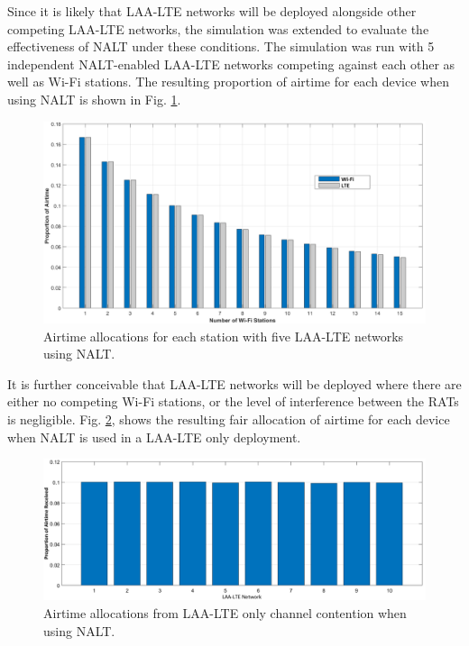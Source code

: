 Since it is likely that \mbox{LAA-LTE} networks will be deployed alongside other competing \mbox{LAA-LTE} networks, the simulation was extended to evaluate the effectiveness of NALT under these conditions.  The simulation was run with 5 independent NALT-enabled \mbox{LAA-LTE} networks competing against each other as well as \mbox{Wi-Fi} stations.  The resulting proportion of airtime for each device when using NALT is shown in Fig. \ref{multi-results}.
\begin{figure}[H]	
	\includegraphics[width=\textwidth]{figs/NALT-5-15}
	\caption{Airtime allocations for each station with five \mbox{LAA-LTE} networks using NALT.}
	\label{multi-results}
\end{figure}

It is further conceivable that \mbox{LAA-LTE} networks will be deployed where there are either no competing \mbox{Wi-Fi} stations, or the level of interference between the RATs is negligible.  Fig. \ref{NALT-only-results}, shows the resulting fair allocation of airtime for each device when NALT is used in a \mbox{LAA-LTE} only deployment. 
\begin{figure}[H]
	\includegraphics[width=\textwidth]{figs/LAAonly}
	\caption{Airtime allocations from \mbox{LAA-LTE} only channel contention when using NALT.}
	\label{NALT-only-results}
\end{figure}

